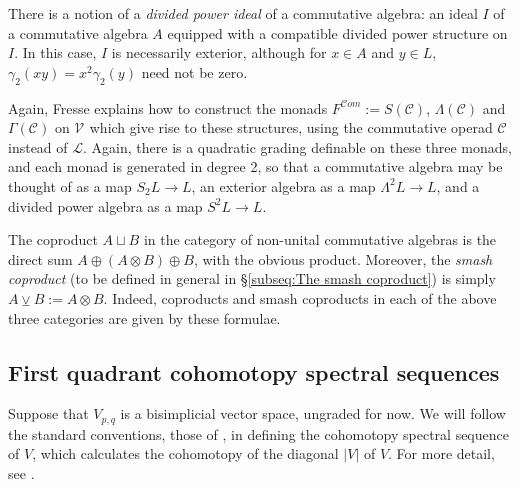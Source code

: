 \documentclass[11pt]{amsart} \renewcommand{\baselinestretch}{1.2}
\theoremstyle{plain}
\theoremstyle{definition}
\renewcommand{\to}{\longrightarrow}
\newcommand{\scrL}{\mathscr{L}}
\newcommand{\scrC}{\mathscr{C}}
\newcommand{\calV}{\mathcal{V}}
\newcommand{\citeBOX}[2][]{\cite[\mbox{#1}]{#2}}
\newcommand{\LieOperad}{{\scrL}}
\newcommand{\CommOperad}{{\scrC}}
\newcommand{\vect}[2]{\calV^{#1}_{#2}}
\newcommand{\algs}{{\scrC\!\textit{om}}}
\newcommand{\diag}[1]{|#1|}
\newcommand{\smashcoprod}{\veebar}%
\begin{document}
\begin{Conventions and notation}
There is a notion of a \emph{divided power ideal} of a commutative algebra: an ideal $I$ of a commutative algebra $A$ equipped with a compatible divided power structure on $I$. In this case, $I$ is necessarily exterior, although for $x\in A$ and $y\in L$, $\gamma_2(xy)=x^2\gamma_2(y)$ need not be zero.

Again, Fresse \cite{FresseSimplicialAlgs.pdf} explains how to construct the monads $F^{\algs}:=S(\CommOperad)$, $\Lambda(\CommOperad)$ and $\Gamma(\CommOperad)$ on $\vect{}{}$ which give rise to these structures, using the commutative operad $\CommOperad$ instead of $\LieOperad$. Again, there is a quadratic grading definable on these three monads, and each monad is generated in degree 2, so that a commutative algebra may be thought of as a  map $S_2L\to L$, an exterior algebra as a map $\Lambda^2L\to L$, and a divided power algebra as a map $S^2L\to L$.

The coproduct $A\sqcup B$ in the category of non-unital commutative algebras is the direct sum $A\oplus (A\otimes B)\oplus B$, with the obvious product. Moreover, the \emph{smash coproduct} (to be defined in general in \S\ref{subseq:The smash coproduct}) is simply $A\smashcoprod B:=A\otimes B$. Indeed, coproducts and smash coproducts in each of the above three categories are given by these formulae.

















\subsection{First quadrant cohomotopy spectral sequences}
Suppose that $V_{p,q}$ is a bisimplicial vector space, ungraded for now. We will follow the standard conventions, those of \cite{MR2245560}, in defining the cohomotopy spectral sequence of $V$, which calculates the cohomotopy of the diagonal $\diag{V} $ of $V$. For  more detail, see \citeBOX[\S1.15]{MR2245560}.   


\end{Conventions and notation}
\end{document}

